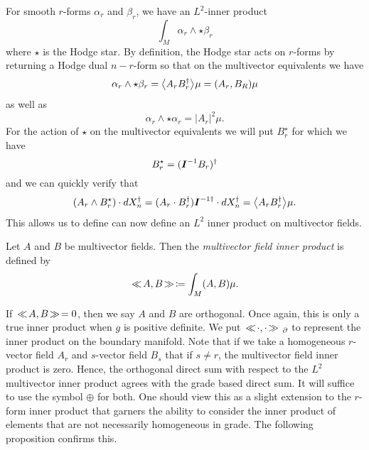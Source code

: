 For smooth $r$-forms $\alpha_r$ and $\beta_r$, we have an $L^2$-inner product 
\begin{equation}
\int_M \alpha_r \wedge \star \beta_r 
\end{equation}
where $\star$ is the Hodge star. By definition, the Hodge star acts on $r$-forms by returning a Hodge dual $n-r$-form so that on the multivector equivalents we have
\begin{equation}
\alpha_r \wedge \star \beta_r  = \proj{}{A_r B_r^\dagger}\mu = (A_r,B_R)\mu
\end{equation}
as well as
\begin{equation}
    \alpha_r \wedge \star \alpha_r = |A_r|^2\mu.
\end{equation}
For the action of $\star$ on the multivector equivalents we will put $B_r^\star$ for which we have
\begin{equation}
B_r^\star = (\boldsymbol{I}^{-1} B_r)^\dagger
\end{equation}
and we can quickly verify that
\begin{align}
(A_r \wedge B_r^\star)\cdot dX_n^\dagger = (A_r\cdot B_r^\dagger) \pseudoscalar^{-1 \dagger}\cdot dX_n^\dagger = \proj{}{A_rB_r^\dagger}\mu.
\end{align}
This allows us to define can now define an $L^2$ inner product on multivector fields.
\begin{definition}
\label{def:multivector_field_inner_product}
Let $A$ and $B$ be multivector fields. Then the \emph{multivector field inner product} is defined by
\begin{equation}
\hspace*{.5mm}\ll \hspace*{-.5mm} A, B \hspace*{-.5mm}\gg \hspace*{.5mm} \coloneqq \int_M (A,B) \mu.
\end{equation}
\end{definition}
If $\hspace*{.5mm}\ll \hspace*{-.5mm} A, B \hspace*{-.5mm}\gg \hspace*{.5mm} = 0$, then we say $A$ and $B$ are orthogonal. Once again, this is only a true inner product when $g$ is positive definite.  We put $\hspace*{.5mm}\ll \hspace*{-.5mm} \cdot, \cdot \hspace*{-.5mm}\gg \hspace*{.5mm}_\partial$ to represent the inner product on the boundary manifold. Note that if we take a homogeneous $r$-vector field $A_r$ and $s$-vector field $B_s$ that if $s\neq r$, the multivector field inner product is zero. Hence, the orthogonal direct sum with respect to the $L^2$ multivector inner product agrees with the grade based direct sum. It will suffice to use the symbol $\oplus$ for both. One should view this as a slight extension to the $r$-form inner product that garners the ability to consider the inner product of elements that are not necessarily homogeneous in grade. The following proposition confirms this.
